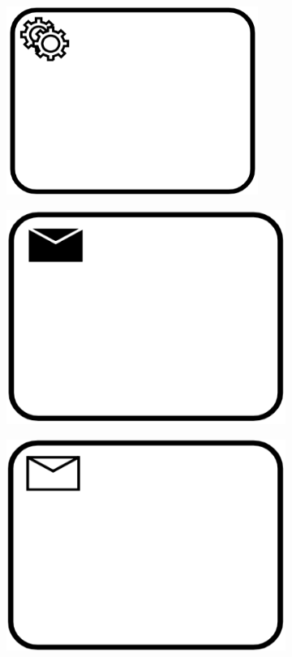 \begin{figure}[H]
	\centering
	\begin{subfigure}[b]{0.18\columnwidth}
		\centering
		\includegraphics[width=0.9\textwidth]{graphics/service-task}
		\label{fig:servicetask}
	\end{subfigure}
	\begin{subfigure}[b]{0.18\columnwidth}
		\centering
		\includegraphics[width=0.9\columnwidth]{graphics/send-task}
		\label{fig:sendtask}
	\end{subfigure}
	\begin{subfigure}[b]{0.18\columnwidth}
		\centering
		\includegraphics[width=0.9\columnwidth]{graphics/receive-task}

\end{subfigure}
\end{figure}
